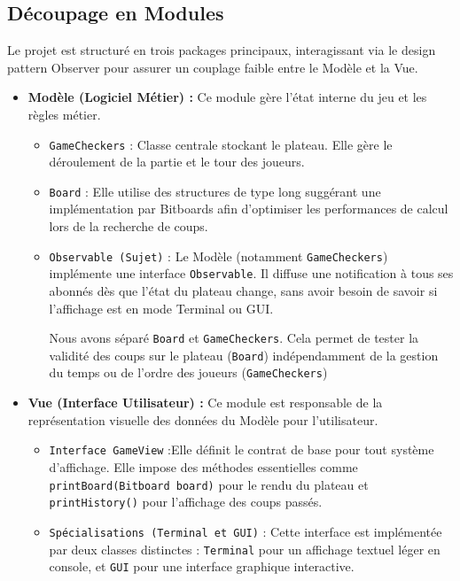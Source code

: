 \documentclass[11pt,a4paper]{article}
\begin{document}
\subsection{Découpage en Modules}

Le projet est structuré en trois packages principaux, interagissant via le design pattern Observer pour assurer un couplage faible entre le Modèle et la Vue.

\begin{itemize}
    \item \textbf{Modèle (Logiciel Métier) :} 
    Ce module gère l'état interne du jeu et les règles métier.
    \begin{itemize}
        \item \texttt{GameCheckers} : Classe centrale stockant le plateau. Elle gère le déroulement de la partie et le tour des joueurs.
        \item \texttt{Board} : Elle utilise des structures de type long suggérant une implémentation par Bitboards afin d'optimiser les performances de calcul lors de la recherche de coups.
        \item \texttt{Observable (Sujet)} : Le Modèle (notamment \texttt{GameCheckers}) implémente une interface \texttt{Observable}. Il diffuse une notification à tous ses abonnés dès que l'état du plateau change, sans avoir besoin de savoir si l'affichage est en mode Terminal ou GUI.

       Nous avons séparé \texttt{Board} et \texttt{GameCheckers}. Cela permet de tester la validité des coups sur le plateau (\texttt{Board}) indépendamment de la gestion du temps ou de l'ordre des joueurs (\texttt{GameCheckers})
    \end{itemize}

    \item \textbf{Vue (Interface Utilisateur) :}
    Ce module est responsable de la représentation visuelle des données du Modèle pour l'utilisateur.
    \begin{itemize}
        \item \texttt{Interface GameView} :Elle définit le contrat de base pour tout système d'affichage. Elle impose des méthodes essentielles comme \texttt{printBoard(Bitboard board)} pour le rendu du plateau et \texttt{printHistory()} pour l'affichage des coups passés.
        
        \item \texttt{Spécialisations (\texttt{Terminal} et \texttt{GUI})}  : Cette interface est implémentée par deux classes distinctes : \texttt{Terminal} pour un affichage textuel léger en console, et \texttt{GUI} pour une interface graphique interactive.


\end{itemize}
\end{itemize}
\end{document}
